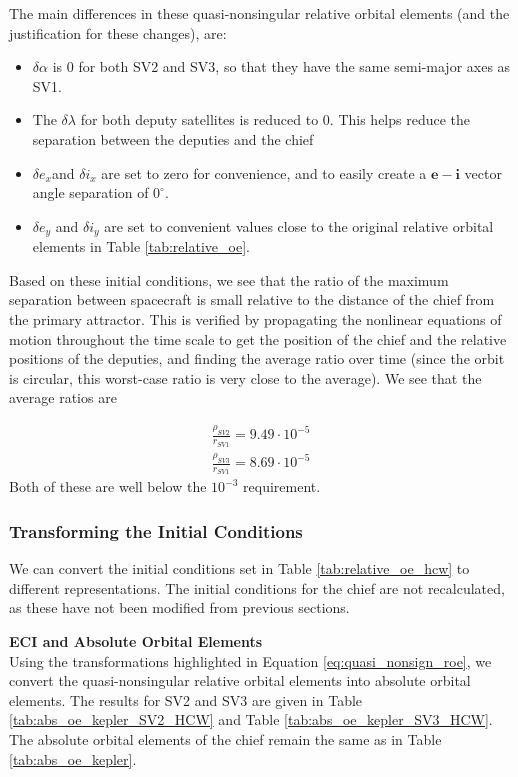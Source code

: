 The main differences in these quasi-nonsingular relative orbital elements (and the justification for these changes), are:
\begin{itemize}
    \item $\delta\alpha$ is 0 for both SV2 and SV3, so that they have the same semi-major axes as SV1.
    \item The $\delta\lambda$ for both deputy satellites is reduced to 0. This helps reduce the separation between the deputies and the chief
    \item $\delta e_x$and $\delta i_x$ are set to zero for convenience, and to easily create a $\boldsymbol{e}-\boldsymbol{i}$ vector angle separation of $0^\circ$.
    \item $\delta e_y$ and $\delta i_y$ are set to convenient values close to the original relative orbital elements in Table \ref{tab:relative_oe}.
\end{itemize}

Based on these initial conditions, we see that the ratio of the maximum separation between spacecraft is small relative to the distance of the chief from the primary attractor. This is verified by propagating the nonlinear equations of motion throughout the time scale to get the position of the chief and the relative positions of the deputies, and finding the average ratio over time (since the orbit is circular, this worst-case ratio is very close to the average). We see that the average ratios are

\begin{align}
    \frac{\rho_{SV2}}{r_{SV1}} = 9.49\cdot10^{-5} \\
    \frac{\rho_{SV3}}{r_{SV1}} = 8.69\cdot10^{-5}
\end{align}
Both of these are well below the $10^{-3}$ requirement.

\subsubsection{Transforming the Initial Conditions} \label{sec:hcw_initial_conditions}
We can convert the initial conditions set in Table \ref{tab:relative_oe_hcw} to different representations. The initial conditions for the chief are not recalculated, as these have not been modified from previous sections.

\textbf{ECI and Absolute Orbital Elements} \\
Using the transformations highlighted in Equation \ref{eq:quasi_nonsign_roe}, 
we convert the quasi-nonsingular relative orbital elements into absolute orbital elements. The results for SV2 and SV3 are given in Table \ref{tab:abs_oe_kepler_SV2_HCW} and Table \ref{tab:abs_oe_kepler_SV3_HCW}. The absolute orbital elements of the chief remain the same as in Table \ref{tab:abs_oe_kepler}.

